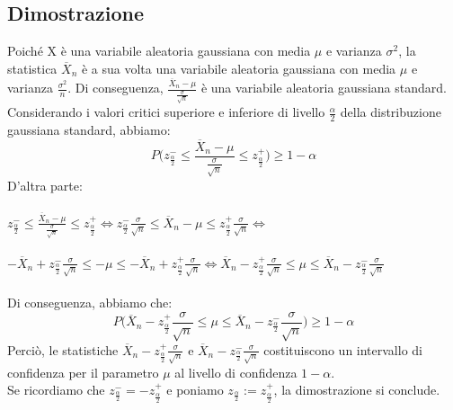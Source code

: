 \documentclass{article}
\begin{document}
\subsection*{Dimostrazione}
Poiché X è una variabile aleatoria gaussiana con media $\mu$ e varianza $\sigma^{2}$, la statistica $\overline{X}_{n}$ è a sua volta una variabile aleatoria gaussiana con media $\mu$ e varianza $\frac{\sigma^{2}}{n}$. Di conseguenza, $\frac{\overline{X}_{n} - \mu}{\frac{\sigma}{\sqrt{n}}}$ è una variabile aleatoria gaussiana standard.\\
Considerando i valori critici superiore e inferiore di livello $\frac{\alpha}{2}$ della distribuzione gaussiana standard, abbiamo:
\[ P\Bigg( z_{\frac{\alpha}{2}}^{-} \leq \frac{\overline{X}_{n} - \mu}{\frac{\sigma}{\sqrt{n}}} \leq z_{\frac{\alpha}{2}}^{+} \Bigg) \geq 1-\alpha \]
D'altra parte:\\ \\
$z_{\frac{\alpha}{2}}^{-} \leq \frac{\overline{X}_{n} - \mu}{\frac{\sigma}{\sqrt{n}}} \leq z_{\frac{\alpha}{2}}^{+} \iff z_{\frac{\alpha}{2}}^{-}\frac{\sigma}{\sqrt{n}} \leq \overline{X}_{n} - \mu \leq z_{\frac{\alpha}{2}}^{+}\frac{\sigma}{\sqrt{n}} \iff$\\ \\
$-\overline{X}_{n}+z_{\frac{\alpha}{2}}^{-}\frac{\sigma}{\sqrt{n}} \leq -\mu \leq -\overline{X}_{n}+z_{\frac{\alpha}{2}}^{+}\frac{\sigma}{\sqrt{n}} \iff \overline{X}_{n}-z_{\frac{\alpha}{2}}^{+}\frac{\sigma}{\sqrt{n}} \leq \mu \leq \overline{X}_{n}-z_{\frac{\alpha}{2}}^{-}\frac{\sigma}{\sqrt{n}}$\\
\\
Di conseguenza, abbiamo che:
\[ P\Big( \overline{X}_{n}-z_{\frac{\alpha}{2}}^{+}\frac{\sigma}{\sqrt{n}} \leq \mu \leq \overline{X}_{n}-z_{\frac{\alpha}{2}}^{-}\frac{\sigma}{\sqrt{n}} \Big) \geq 1-\alpha \]
Perciò, le statistiche $\overline{X}_{n}-z_{\frac{\alpha}{2}}^{+}\frac{\sigma}{\sqrt{n}}$ e $\overline{X}_{n}-z_{\frac{\alpha}{2}}^{-}\frac{\sigma}{\sqrt{n}}$ costituiscono un intervallo di confidenza per il parametro $\mu$ al livello di confidenza $1-\alpha$.\\
Se ricordiamo che $z_{\frac{\alpha}{2}}^{-} = -z_{\frac{\alpha}{2}}^{+}$ e poniamo $z_{\frac{\alpha}{2}} := z_{\frac{\alpha}{2}}^{+}$, la dimostrazione si conclude.
\end{document}
